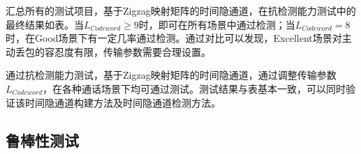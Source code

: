 
汇总所有的测试项目，基于Zigzag映射矩阵的时间隐通道，在抗检测能力测试中的最终结果如表。当$L_{Codeword}\ge 9$时，即可在所有场景中通过检测；当$L_{Codeword} = 8$时，在Good场景下有一定几率通过检测。通过对比可以发现，Excellent场景对主动丢包的容忍度有限，传输参数需要合理设置。

通过抗检测能力测试，基于Zigzag映射矩阵的时间隐通道，通过调整传输参数$L_{Codeword}$，在各种通话场景下均可通过测试。测试结果与表基本一致，可以同时验证该时间隐通道构建方法及时间隐通道检测方法。

\subsection{鲁棒性测试}
\label{chap:zigzag:results:robustness}

